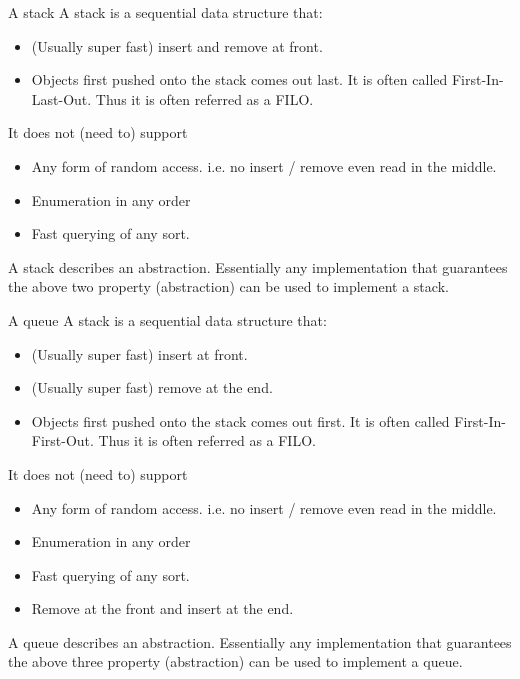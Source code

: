 \begin{frame}{A stack}
A stack is a sequential data structure that:
\begin{itemize}
	\item (Usually super fast) insert and remove at front.
	\item Objects first pushed onto the stack comes out last. It is often called First-In-Last-Out. Thus it is often referred as a FILO.
\end{itemize}
It does not (need to) support
\begin{itemize}
	\item Any form of random access. i.e. no insert / remove even read in the middle.
	\item Enumeration in any order
	\item Fast querying of any sort. 
\end{itemize}
A stack describes an abstraction. Essentially any implementation that guarantees the above two property (abstraction) can be used to implement a stack.
\end{frame}

\begin{frame}{A queue}
A stack is a sequential data structure that:
\begin{itemize}
	\item (Usually super fast) insert at front.
	\item (Usually super fast) remove at \alert{the end}.
	\item Objects first pushed onto the stack comes out first. It is often called First-In-\alert{First}-Out. Thus it is often referred as a FILO.
\end{itemize}
It does not (need to) support
\begin{itemize}
	\item Any form of random access. i.e. no insert / remove even read in the middle.
	\item Enumeration in any order
	\item Fast querying of any sort. 
	\item \alert{Remove at the front and insert at the end.}
\end{itemize}
A queue describes an abstraction. Essentially any implementation that guarantees the above three property (abstraction) can be used to implement a queue.
\end{frame}

